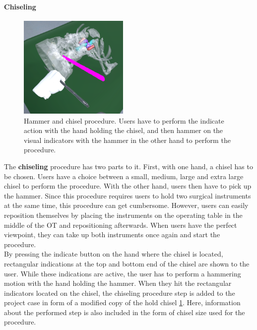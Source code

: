 \paragraph{Chiseling}

\begin{figure}[ht]
    \centering
    \includegraphics[width=200px]{images/implementation/features/procedures/chisel.png}
    \caption{\label{fig::FeatureChisel}Hammer and chisel procedure. Users have to perform the indicate action with the hand holding the chisel, and then hammer on the visual 
    indicators with the hammer in the other hand to perform the procedure.}
\end{figure}

The \textbf{chiseling} procedure has two parts to it.
First, with one hand, a chisel has to be chosen.
Users have a choice between a small, medium, large and extra large chisel to perform the procedure.
With the other hand, users then have to pick up the hammer.
Since this procedure requires users to hold two surgical instruments at the same time, this procedure can get cumbersome.
However, users can easily reposition themselves by placing the instruments on the operating table in the middle of the OT and repositioning afterwards.
When users have the perfect viewpoint, they can take up both instruments once again and start the procedure.
\\ By pressing the indicate button on the hand where the chisel is located, rectangular indications at the top and bottom end of the chisel are shown to the user.
While these indications are active, the user has to perform a hammering motion with the hand holding the hammer.
When they hit the rectangular indicators located on the chisel, the chiseling procedure step is added to the project case in form of a modified copy of the hold chisel \ref{fig::FeatureChisel}.
Here, information about the performed step is also included in the form of chisel size used for the procedure. 